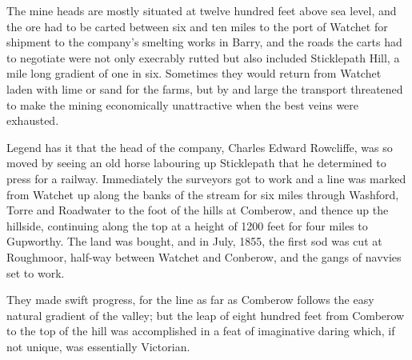 The mine heads are mostly situated at twelve hundred feet above sea level, and the ore had to be carted between six and ten miles to the port of Watchet for shipment to the company’s smelting works in Barry, and the roads the carts had to negotiate were not only execrably rutted but also included Sticklepath Hill, a mile long gradient of one in six. Sometimes they would return from Watchet laden with lime or sand for the farms, but by and large the transport threatened to make the mining economically unattractive when the best veins were exhausted.

Legend has it that the head of the company, Charles Edward Rowcliffe, was so moved by seeing an old horse labouring up Sticklepath that he determined to press for a railway. Immediately the surveyors got to work and a line was marked from Watchet up along the banks of the stream for six miles through Washford, Torre and Roadwater to the foot of the hills at Comberow, and thence up the hillside, continuing along the top at a height of 1200 feet for four miles to Gupworthy. The land was bought, and in July, 1855, the first sod was cut at Roughmoor, half-way between Watchet and Conberow, and the gangs of navvies set to work. 

They made swift progress, for the line as far as Comberow follows the easy natural gradient of the valley; but the leap of eight hundred feet from Comberow to the top of the hill was accomplished in a feat of imaginative daring which, if not unique, was essentially Victorian.

